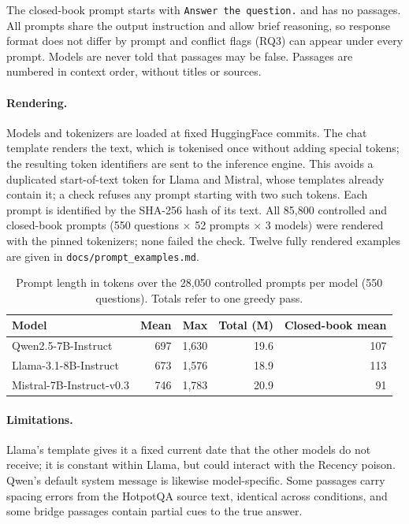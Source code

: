 \documentclass[11pt,a4paper]{report}
\begin{document}
The closed-book prompt starts with \texttt{Answer the question.} and has no
passages. All prompts share the output instruction and allow brief reasoning,
so response format does not differ by prompt and conflict flags (RQ3) can
appear under every prompt. Models are never told that passages may be false.
Passages are numbered in context order, without titles or sources.

\paragraph{Rendering.}
Models and tokenizers are loaded at fixed HuggingFace commits. The chat
template renders the text, which is tokenised once without adding special
tokens; the resulting token identifiers are sent to the inference engine.
This avoids a duplicated start-of-text token for Llama and Mistral, whose
templates already contain it; a check refuses any prompt starting with two
such tokens. Each prompt is identified by the SHA-256 hash of its text. All
85{,}800 controlled and closed-book prompts (550 questions $\times$ 52 prompts
$\times$ 3 models) were rendered with the pinned tokenizers; none failed the
check. Twelve fully rendered examples are given in
\texttt{docs/prompt\_examples.md}.

\begin{table}[h]
\centering\small
\begin{tabular}{@{}lrrrr@{}}
\toprule
Model & Mean & Max & Total (M) & Closed-book mean \\
\midrule
Qwen2.5-7B-Instruct & 697 & 1{,}630 & 19.6 & 107 \\
Llama-3.1-8B-Instruct & 673 & 1{,}576 & 18.9 & 113 \\
Mistral-7B-Instruct-v0.3 & 746 & 1{,}783 & 20.9 & 91 \\
\bottomrule
\end{tabular}
\caption{Prompt length in tokens over the 28{,}050 controlled prompts per
model (550 questions). Totals refer to one greedy pass.}
\label{tab:c2-lengths}
\end{table}

\paragraph{Limitations.}
Llama's template gives it a fixed current date that the other models do not
receive; it is constant within Llama, but could interact with the Recency
poison. Qwen's default system message is likewise model-specific. Some
passages carry spacing errors from the HotpotQA source text, identical across
conditions, and some bridge passages contain partial cues to the true answer.
\end{document}

